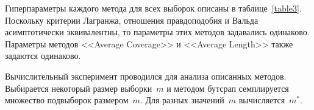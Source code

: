 Гиперпараметры каждого метода для всех выборок описаны в таблице~\ref{table3}. Поскольку критерии Лагранжа, отношения правдоподобия и Вальда асимптотически эквивалентны, то параметры этих методов задавались одинаково. Параметры методов <<Average Coverage>> и <<Average Length>> также задаются одинаково.

\begin{table}[h!]
\begin{center}
\caption{Экспертные оценки гиперпараметров для разных методов оценки объема выборки}
\label{table3}
\end{center}
\end{table}


Вычислительный эксперимент проводился для анализа описанных методов. Выбирается некоторый размер выборки~$m$ и методом бутсрап семплируется множество подвыборок размером~$m$. Для разных значений~$m$ вычисляется~$m^*$.
    
